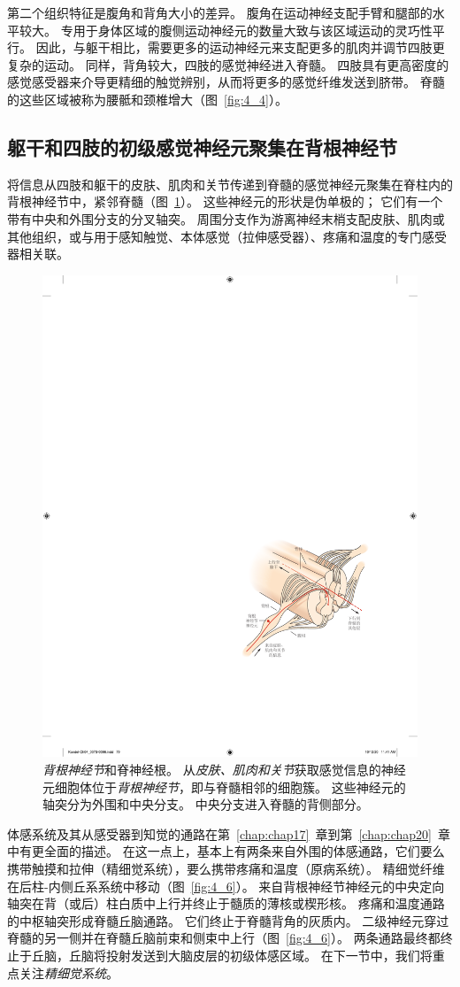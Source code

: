 第二个组织特征是腹角和背角大小的差异。
腹角在运动神经支配手臂和腿部的水平较大。
专用于身体区域的腹侧运动神经元的数量大致与该区域运动的灵巧性平行。
因此，与躯干相比，需要更多的运动神经元来支配更多的肌肉并调节四肢更复杂的运动。
同样，背角较大，四肢的感觉神经进入脊髓。
四肢具有更高密度的感觉感受器来介导更精细的触觉辨别，从而将更多的感觉纤维发送到脐带。
脊髓的这些区域被称为腰骶和颈椎增大（图~\ref{fig:4_4}）。



\subsection{躯干和四肢的初级感觉神经元聚集在背根神经节}

将信息从四肢和躯干的皮肤、肌肉和关节传递到脊髓的感觉神经元聚集在脊柱内的背根神经节中，紧邻脊髓（图~\ref{fig:4_5}）。 
这些神经元的形状是伪单极的；
它们有一个带有中央和外围分支的分叉轴突。
周围分支作为游离神经末梢支配皮肤、肌肉或其他组织，或与用于感知触觉、本体感觉（拉伸感受器）、疼痛和温度的专门感受器相关联。


\begin{figure}[htbp]
	\centering
	\includegraphics[width=0.65\linewidth]{chap04/fig_4_5}
	\caption{\textit{背根神经节}和脊神经根。
		从\textit{皮肤、肌肉和关节}获取感觉信息的神经元细胞体位于\textit{背根神经节}，即与脊髓相邻的细胞簇。
		这些神经元的轴突分为外围和中央分支。 
		中央分支进入脊髓的背侧部分。}
	\label{fig:4_5}
\end{figure}


体感系统及其从感受器到知觉的通路在第~\ref{chap:chap17}~章到第~\ref{chap:chap20}~章中有更全面的描述。
在这一点上，基本上有两条来自外围的体感通路，它们要么携带触摸和拉伸（精细觉系统），要么携带疼痛和温度（原病系统）。
精细觉纤维在后柱-内侧丘系系统中移动（图~\ref{fig:4_6}）。
来自背根神经节神经元的中央定向轴突在背（或后）柱白质中上行并终止于髓质的薄核或楔形核。
疼痛和温度通路的中枢轴突形成脊髓丘脑通路。
它们终止于脊髓背角的灰质内。
二级神经元穿过脊髓的另一侧并在脊髓丘脑前束和侧束中上行（图~\ref{fig:4_6}）。 
两条通路最终都终止于丘脑，丘脑将投射发送到大脑皮层的初级体感区域。
在下一节中，我们将重点关注\textit{精细觉系统}。


